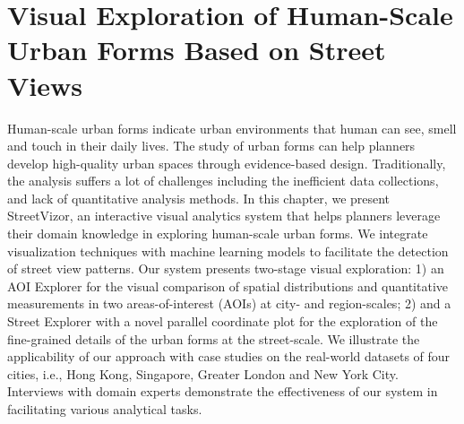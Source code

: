 \chapter{Visual Exploration of Human-Scale Urban Forms Based on Street Views}\label{chap:c1_intro}
Human-scale urban forms indicate urban environments that human can see, smell and touch in their daily lives. The study of urban forms can help planners develop high-quality urban spaces through evidence-based design.
Traditionally, the analysis suffers a lot of challenges including the inefficient data collections, and lack of quantitative analysis methods.
In this chapter, we present StreetVizor, an interactive visual analytics system that helps planners leverage their domain knowledge in exploring human-scale urban forms. We integrate visualization techniques with machine learning models to facilitate the detection of street view patterns. 
Our system presents two-stage visual exploration: 
1) an AOI Explorer for the visual comparison of spatial distributions and quantitative measurements in two areas-of-interest (AOIs) at city- and region-scales;
2) and a Street Explorer with a novel parallel coordinate plot for the exploration of the fine-grained details of the urban forms at the street-scale.
We illustrate the applicability of our approach with case studies on the real-world datasets of four cities, i.e., Hong Kong, Singapore, Greater London and New York City.
Interviews with domain experts demonstrate the effectiveness of our system in facilitating various analytical tasks.












